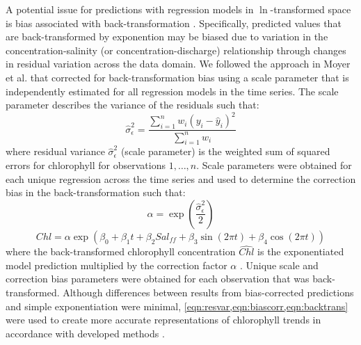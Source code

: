 \documentclass{svjour3}\usepackage[]{graphicx}\usepackage[]{color}
\begin{document}
A potential issue for predictions with regression models in $\ln$-transformed space is bias associated with back-transformation \cite{Duan83}.  Specifically, predicted values that are back-transformed by exponention may be biased due to variation in the concentration-salinity (or concentration-discharge) relationship through changes in residual variation across the data domain.  We followed the approach in Moyer et al. \cite{Moyer12} that corrected for back-transformation bias using a scale parameter that is independently estimated for all regression models in the time series.  The scale parameter describes the variance of the residuals such that: 
\begin{equation}\label{eqn:resvar}
\hat{\sigma}_\epsilon^2 =\frac{\sum\limits_{{i = 1}}^n w_i \left(y_i - \hat{y}_i \right)^2}{\sum\limits_{{i = 1}}^n w_i }
\end{equation}
\noindent where residual variance $\hat{\sigma}_\epsilon^2$ (scale parameter) is the weighted sum of squared errors for chlorophyll for observations $1,\ldots,n$.  Scale parameters were obtained for each unique regression across the time series and used to determine the correction bias in the back-transformation such that:
\begin{equation}\label{eqn:biascorr}
\alpha = \exp\left(\frac{\hat{\sigma}_\epsilon^2}{2}\right)
\end{equation}
\begin{equation}\label{eqn:backtrans}
\hat{Chl} = \alpha \exp\left(\beta_0 + \beta_1 t + \beta_2 Sal_{ff} + \beta_3 \sin\left(2\pi t\right) + \beta_4 \cos\left(2\pi t\right)\right)
\end{equation}
\noindent where the back-transformed chlorophyll concentration $\hat{Chl}$ is the exponentiated model prediction multiplied by the correction factor $\alpha$ \cite{Moyer12}.  Unique scale and correction bias parameters were obtained for each observation that was back-transformed.  Although differences between results from bias-corrected predictions and simple exponentiation were minimal, \cref{eqn:resvar,eqn:biascorr,eqn:backtrans} were used to create more accurate representations of chlorophyll trends in accordance with developed methods \cite{Hirsch10,Moyer12}. 
\end{document}
